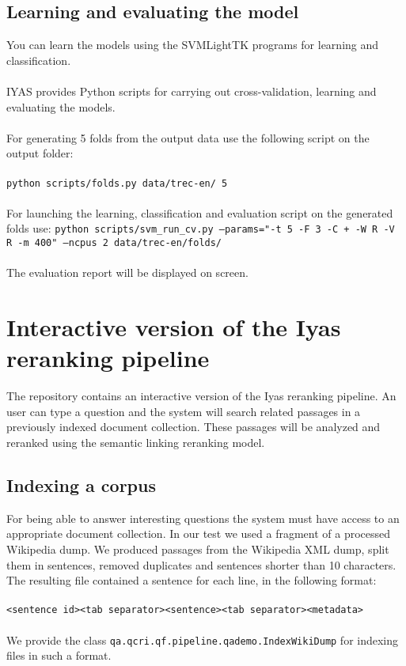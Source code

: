 \documentclass{wileysev}
\begin{document}
\subsection{Learning and evaluating the model}
You can learn the models using the SVMLightTK programs for learning and classification.
\\\\
IYAS provides Python scripts for carrying out cross-validation, learning and evaluating the models.
\\\\
For generating 5 folds from the output data use the following script on the output folder:
\\\\
\texttt{python scripts/folds.py data/trec-en/ 5}
\\\\
For launching the learning, classification and evaluation script on the generated folds use:
\texttt{python scripts/svm\_run\_cv.py --params="-t 5 -F 3 -C + -W R -V R -m 400" --ncpus 2 data/trec-en/folds/}
\\\\
The evaluation report will be displayed on screen.

\section{Interactive version of the Iyas reranking pipeline}

The repository contains an interactive version of the Iyas reranking pipeline. An user can type a question and the system will search related passages in a previously indexed document collection. These passages will be analyzed and reranked using the semantic linking reranking model.

\subsection{Indexing a corpus}
For being able to answer interesting questions the system must have access to an appropriate document collection. In our test we used a fragment of a processed Wikipedia dump. We produced passages from the Wikipedia XML dump, split them in sentences, removed duplicates and sentences shorter than 10 characters. The resulting file contained a sentence for each line, in the following format:
\\\\
\texttt{\small{<sentence id><tab separator><sentence><tab separator><metadata>}}
\\\\
We provide the class \texttt{qa.qcri.qf.pipeline.qademo.IndexWikiDump} for indexing files in such a format.
\end{document}
